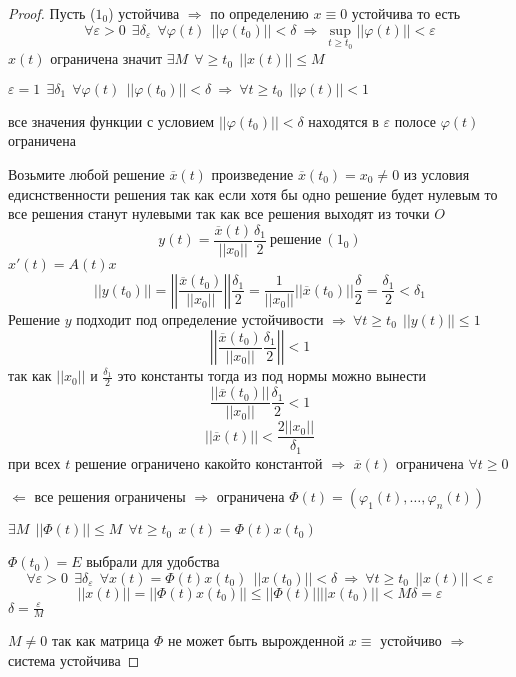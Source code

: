 \begin{proof}
  Пусть ($1_0$) устойчива $\Rightarrow$ по определению $x \equiv 0$ устойчива
  то есть
  $$
  \forall \varepsilon > 0 ~~ \exists \delta_{\varepsilon} ~~ \forall \varphi(t)
  ~~ ||\varphi(t_0)|| < \delta ~ \Rightarrow ~ \sup_{t \ge t_0} ||\varphi(t)||
  < \varepsilon
  $$
  $x(t)$ ограничена значит $\exists M ~~ \forall \ge t_0 ~~ ||x(t)|| \le M$

  $\varepsilon = 1 ~~ \exists \delta_1 ~~ \forall \varphi(t) ~~ ||\varphi(t_0)||
  < \delta ~ \Rightarrow ~ \forall t \ge t_0 ~~ ||\varphi(t)|| < 1$

  все значения функции с условием $||\varphi(t_0)|| < \delta$ находятся в
  $\varepsilon$ полосе $\varphi(t)$ ограничена

  Возьмите любой решение $\overline{x}(t)$ произведение $\overline{x}(t_0) =
  x_0 \not = 0$ из условия едиснственности решения так как если хотя бы одно
  решение будет нулевым то все решения станут нулевыми так как все решения
  выходят из точки $O$
  $$
  y(t) = \frac{\overline{x}(t)}{||x_0||} \frac{\delta_1}{2} ~ \text{решение} ~
  (1_0)
  $$
  $x'(t) = A(t) x$
  $$
  ||y(t_0)|| = \left|\left| \frac{\overline{x}(t_0)}{||x_0||} \right|\right|
  \frac{\delta_1}{2} = \frac{1}{||x_0||} ||\overline{x}(t_0)||
  \frac{\delta}{2} = \frac{\delta_1}{2} < \delta_1
  $$
  Решение $y$ подходит под определение устойчивости $\Rightarrow ~ \forall
  t \ge t_0 ~~ ||y(t)|| \le 1$
  $$
  \left|\left| \frac{\overline{x}(t_0)}{||x_0||} \frac{\delta_1}{2}
  \right|\right| < 1
  $$
  так как $||x_0||$ и $\frac{\delta_1}{2}$ это константы тогда из под нормы
  можно вынести
  $$
  \frac{||\overline{x}(t_0)||}{||x_0||} \frac{\delta_1}{2} < 1
  $$
  $$
  ||\overline{x}(t)|| < \frac{2||x_0||}{\delta_1}
  $$
  при всех $t$ решение ограничено какойто константой $\Rightarrow$
  $\overline{x}(t)$ ограничена $\forall t \ge 0$

  $\Leftarrow$ все решения ограничены $\Rightarrow$ ограничена $\Phi(t) =
  (\varphi_1(t), \ldots, \varphi_n(t))$

  $\exists M ~~ ||\Phi(t)|| \le M ~~ \forall t \ge t_0 ~~ x(t) = \Phi(t)x(t_0)$

  $\Phi(t_0) = E$ выбрали для удобства
  $$
  \forall \varepsilon > 0 ~~ \exists \delta_{\varepsilon} ~~ \forall x(t) =
  \Phi(t)x(t_0) ~~ ||x(t_0)|| < \delta ~ \Rightarrow ~ \forall t \ge t_0 ~~
  ||x(t)|| < \varepsilon
  $$
  $$
  ||x(t)|| = ||\Phi(t) x(t_0)|| \le ||\Phi(t)|| ||x(t_0)|| < M \delta =
  \varepsilon
  $$
  $\delta = \frac{\varepsilon}{M}$

  $M \not= 0$ так как матрица $\Phi$ не может быть вырожденной $x \equiv$
  устойчиво $\Rightarrow$ система устойчива
\end{proof}

